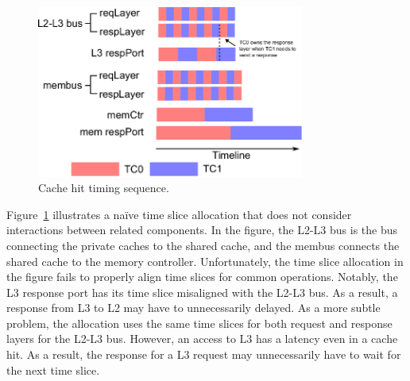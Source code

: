 
\begin{figure}
    \begin{center}
        \includegraphics[width=3.46in]{figs/baseline_schedule.eps}
        \caption{Cache hit timing sequence.}
        \label{fig:naive_scheme}
    \end{center}
\end{figure}

Figure~\ref{fig:naive_scheme} illustrates a naïve time slice allocation that
does not consider interactions between related components.
In the figure, the L2-L3 bus is the bus connecting the private caches 
to the shared cache, and the membus connects the shared cache to the memory 
controller.
Unfortunately, the time slice allocation in the figure fails to properly
align time slices for common operations.
Notably, the L3 response port has its time slice misaligned with the L2-L3
bus. As a result, a response from L3 to L2 may have to unnecessarily delayed.
As a more subtle problem, the allocation uses the same time slices for both
request and response layers for the L2-L3 bus. However, an access to L3 has
a latency even in a cache hit. As a result, the response for a L3 request may
unnecessarily have to wait for the next time slice. 


